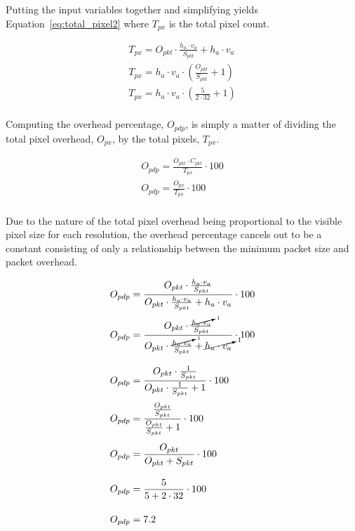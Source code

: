     Putting the input variables together and simplifying yields Equation~\eqref{eq:total_pixel2} where $T_{px}$ is the total pixel count.

    \begin{equation}
        \begin{array}{ l }
            \displaystyle T_{px}=O_{pkt} \cdot \frac{h_a \cdot v_a}{S_{pkt}} + h_a \cdot v_a \\[13pt]
            \displaystyle T_{px}=h_a \cdot v_a \cdot (\frac{O_{pkt}}{S_{pkt}} + 1) \\[13pt]
            \displaystyle T_{px}=h_a \cdot v_a \cdot (\frac{5}{2 \cdot 32} + 1) \\[13pt]
        \end{array}
        \label{eq:total_pixel2}
    \end{equation}

    Computing the overhead percentage, $O_{pdp}$, is simply a matter of dividing the total pixel overhead, $O_{px}$, by the total pixels, $T_{px}$.

    \begin{equation}
        \begin{array}{ l }
            \displaystyle O_{pdp}=\frac{O_{pkt}\cdot C_{pkt}}{T_{px}} \cdot 100 \\[13pt]
            \displaystyle O_{pdp}=\frac{O_{px}}{T_{px}} \cdot 100 \\[13pt]
        \end{array}
        \label{eq:overhead}
    \end{equation}

    Due to the nature of the total pixel overhead being proportional to the visible pixel size for each resolution, the overhead percentage cancels out to be a constant consisting of only a relationship between the minimum packet size and packet overhead.

    \begin{equation}
        \begin{array}{ l }
            \displaystyle O_{pdp}=\frac{O_{pkt}\cdot \frac{h_a \cdot v_a}{S_{pkt}}}{O_{pkt} \cdot \frac{h_a \cdot v_a}{S_{pkt}} + h_a \cdot v_a} \cdot 100 \\[16pt]
            \displaystyle O_{pdp}=\frac{O_{pkt}\cdot \frac{\cancelto{1}{h_a \cdot v_a}}{S_{pkt}}}{O_{pkt} \cdot \frac{\cancelto{1}{h_a \cdot v_a}}{S_{pkt}} + \cancelto{1}{h_a \cdot v_a}} \cdot 100 \\[25pt]
            \displaystyle O_{pdp}=\frac{O_{pkt}\cdot \frac{1}{S_{pkt}}}{O_{pkt} \cdot \frac{1}{S_{pkt}} + 1} \cdot 100 \\[16pt]
            \displaystyle O_{pdp}=\frac{\frac{O_{pkt}}{S_{pkt}}}{\frac{O_{pkt}}{S_{pkt}} + 1} \cdot 100 \\[19pt]
            \displaystyle O_{pdp}=\frac{O_{pkt}}{O_{pkt}+S_{pkt}} \cdot 100 \\[19pt]
            \displaystyle O_{pdp}=\frac{5}{5 + 2 \cdot 32} \cdot 100 \\[19pt]
            \displaystyle O_{pdp}=7.2 \\[13pt]
        \end{array}
        \label{eq:cancel}
    \end{equation}

